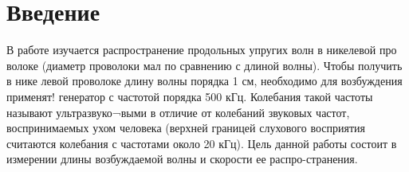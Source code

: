
\usepackage{setspace}
\usepackage{colortbl}
\usepackage{lscape}
\usepackage{booktabs,array}

\def\labauthors{Понур К.А., Сарафанов Ф.Г., Сидоров Д.А.}
\def\labgroup{420}
\def\labnumber{211}
\def\labtheme{Продольные звуковые волны в проволоке}
\renewcommand{\vec}{\mathbf}
\renewcommand{\Re}{\operatorname{Re}}
\renewcommand{\Im}{\operatorname{Im}}
\renewcommand{\phi}{\phi}
\renewcommand{\kappa}{\varkappa}
\renewcommand{\hat}{\widehat}
\renewcommand{\epsilon}{\varepsilon}
\renewcommand{\phi}{\varphi}
\renewcommand{\d}{\partial}



\begin{spacing}{1}
\tableofcontents
\end{spacing}
\newpage
\section{Введение}
В работе изучается распространение продольных упругих волн в никелевой про волоке (диаметр проволоки мал по сравнению с длиной волны). Чтобы получить в нике левой проволоке длину волны порядка 1 см, необходимо для возбуждения применят! генератор с частотой порядка 500 кГц. Колебания такой частоты называют ультразвуко¬выми в отличие от колебаний звуковых частот, воспринимаемых ухом человека (верхней границей слухового восприятия считаются колебания с частотами около 20 кГц). Цель данной работы состоит в измерении длины возбуждаемой волны и скорости ее распро-странения.

